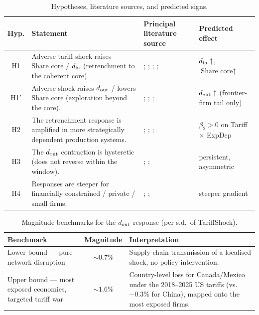 \begin{table}[ht]
\centering
\caption{Hypotheses, literature sources, and predicted signs.}
\label{tab:hyp}
\footnotesize
\setlength{\tabcolsep}{4pt}
\renewcommand{\arraystretch}{1.3}
\begin{tabular}{|c|p{4.4cm}|p{4.2cm}|p{2.5cm}|}
\hline
\textbf{Hyp.} & \textbf{Statement} & \textbf{Principal literature source} & \textbf{Predicted effect} \\
\hline
H1 & Adverse tariff shock raises $\text{Share\_core}$ / $d_{\rm in}$ (retrenchment to the coherent core). &
\citet{fontagne2018}; \citet{bottazzi2006}; \citet{valvano2003}; \citet{dosi1995}; \citet{march1991} &
$d_{\rm in}\uparrow$, $\text{Share\_core}\uparrow$ \\
\hline
H1$'$ & Adverse shock raises $d_{\rm out}$ / lowers $\text{Share\_core}$ (exploration beyond the core). &
\citet{penrose1959}; \citet{teece1982}; \citet{matsusaka2001}; \citet{aghion2005} &
$d_{\rm out}\uparrow$ (frontier-firm tail only) \\
\hline
H2 & The retrenchment response is amplified in more strategically dependent production systems. &
\citet{farrell2019}; \citet{arjona2023}; \citet{korniyenko2017}; \citet{evenett2024} &
$\beta_{2}>0$ on Tariff $\times$ ExpDep \\
\hline
H3 & The $d_{\rm out}$ contraction is hysteretic (does not reverse within the window). &
\citet{crozet2021}; \citet{storper1992}; \citet{riverabatiz1991} &
persistent, asymmetric \\
\hline
H4 & Responses are steeper for financially constrained / private / small firms. &
\citet{guariglia2011}; \citet{vannoorenberghe2016}; \citet{coad2021} &
steeper gradient \\
\hline
\end{tabular}
\end{table}

\begin{table}[ht]
\centering
\caption{Magnitude benchmarks for the $d_{\rm out}$ response (per s.d.\ of TariffShock).}
\label{tab:mag}
\footnotesize
\setlength{\tabcolsep}{4pt}
\renewcommand{\arraystretch}{1.3}
\begin{tabular}{|p{3.8cm}|c|p{6.2cm}|}
\hline
\textbf{Benchmark} & \textbf{Magnitude} & \textbf{Interpretation} \\
\hline
Lower bound --- pure network disruption \citep{korniyenko2017} & $\sim 0.7\%$ &
Supply-chain transmission of a localised shock, no policy intervention. \\
\hline
Upper bound --- most exposed economies, targeted tariff war \citep{teti2025} & $\sim 1.6\%$ &
Country-level loss for Canada/Mexico under the 2018--2025 US tariffs (vs.\ $-0.3\%$ for China), mapped onto the most exposed firms. \\
\hline
\end{tabular}
\end{table}


